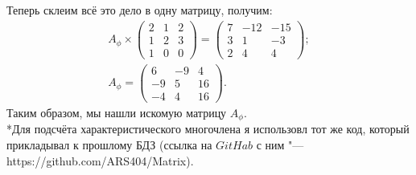 Теперь склеим всё это дело в одну матрицу, получим:
\begin{gather*}
    A_{\phi} \times \begin{pmatrix}
        2 & 1 & 2\\
        1 & 2 & 3\\
        1 & 0 & 0
    \end{pmatrix} = \begin{pmatrix}
        7 & -12 & -15\\
        3 & 1 & -3\\
        2 & 4 & 4
    \end{pmatrix};\\
    A_{\phi} = \begin{pmatrix}
        6 & -9 & 4\\
        -9 & 5 & 16\\
        -4 & 4 & 16
    \end{pmatrix}.
\end{gather*}
Таким образом, мы нашли искомую матрицу $A_{\phi}$.\\
*Для подсчёта характеристического многочлена я использовл тот же код, который прикладывал к прошлому БДЗ (ссылка на $GitHab$ с ним "--- https://github.com/ARS404/Matrix).